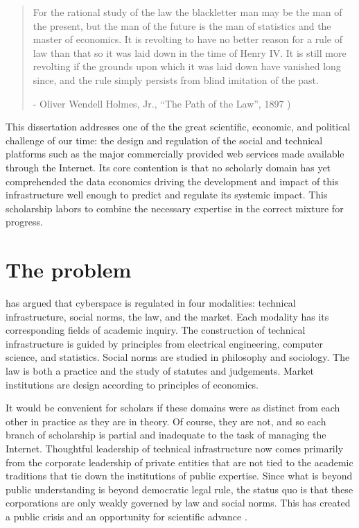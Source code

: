 \documentclass[../thesis.tex]{subfiles}
\begin{document}
 \begin{quote}
   For the rational study of the law the blackletter man may be the man of the present, but the man of the future is the man of statistics and the master of economics. It is revolting to have no better reason for a rule of law than that so it was laid down in the time of Henry IV. It is still more revolting if the grounds upon which it was laid down have vanished long since, and the rule simply persists from blind imitation of the past.

   - Oliver Wendell Holmes, Jr., ``The Path of the Law'', 1897 \cite{holmes1897path})
 \end{quote}
 
 This dissertation addresses one of the the great
 scientific, economic,
 and political challenge of our time: the design and
 regulation of
 the social and technical platforms such as the major
 commercially
 provided web services made available through the Internet.
 Its core contention is that no scholarly domain has yet
 comprehended the
 data economics driving the development and
 impact of this infrastructure well enough to predict and regulate its
 systemic impact.
 This scholarship labors to combine the necessary expertise
 in the correct mixture for progress.

\section{The problem}
 
 \citet{lessig2009code} has argued that cyberspace is regulated
 in four modalities: technical infrastructure, social norms,
 the law, and the market.
 Each modality has its corresponding fields of academic inquiry.
 The construction of technical infrastructure is guided
 by principles from
 electrical engineering, computer science, and statistics.
 Social norms are studied in philosophy and sociology.
 The law is both a practice and the study
 of statutes and judgements.
 Market institutions are design according to principles
 of economics.

 It would be convenient for scholars if these domains were
 as distinct from each other in practice as they are in
 theory.
 Of course, they are not, and so each branch of scholarship
 is partial and inadequate to the task of managing the Internet.
 Thoughtful leadership of technical infrastructure now comes
 primarily from the corporate leadership of private entities
 that are not tied to the academic traditions that tie down
 the institutions of public expertise.
 Since what is beyond public understanding is beyond democratic
 legal rule, the status quo is that these corporations are only
 weakly governed by law and social norms.
 This has created a public crisis
 and an opportunity for
 scientific advance \cite{benthall2016philosophy}.
 
\end{document}
